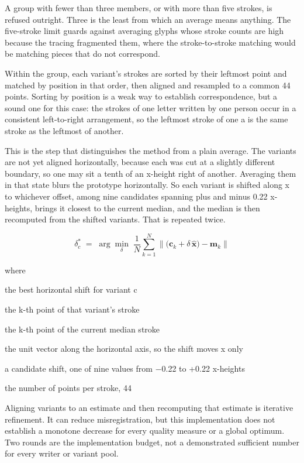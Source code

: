 A group with fewer than three members, or with more than five strokes, is refused outright. Three is the least from which an average means anything. The five-stroke limit guards against averaging glyphs whose stroke counts are high because the tracing fragmented them, where the stroke-to-stroke matching would be matching pieces that do not correspond.


Within the group, each variant's strokes are sorted by their leftmost point and matched by position in that order, then aligned and resampled to a common 44 points. Sorting by position is a weak way to establish correspondence, but a sound one for this case: the strokes of one letter written by one person occur in a consistent left-to-right arrangement, so the leftmost stroke of one a is the same stroke as the leftmost of another.


This is the step that distinguishes the method from a plain average. The variants are not yet aligned horizontally, because each was cut at a slightly different boundary, so one may sit a tenth of an x-height right of another. Averaging them in that state blurs the prototype horizontally. So each variant is shifted along x to whichever offset, among nine candidates spanning plus and minus 0.22 x-heights, brings it closest to the current median, and the median is then recomputed from the shifted variants. That is repeated twice.


\begin{equation}
\delta^{*}_c \;=\; \arg\min_{\delta} \; \frac{1}{N} \sum_{k=1}^{N} \Big\| \big(\mathbf{c}_k + \delta\,\hat{\mathbf{x}}\big) - \mathbf{m}_k \Big\|
\end{equation}

\noindent where
\begin{description}[leftmargin=2.4em,style=nextline,font=\normalfont\ttfamily]\setlength\itemsep{1pt}
  \item[{$\delta^{*}_c$}] \normalfont the best horizontal shift for variant c
  \item[{$\mathbf{c}_k$}] \normalfont the k-th point of that variant's stroke
  \item[{$\mathbf{m}_k$}] \normalfont the k-th point of the current median stroke
  \item[{$\hat{\mathbf{x}}$}] \normalfont the unit vector along the horizontal axis, so the shift moves x only
  \item[{$\delta$}] \normalfont a candidate shift, one of nine values from $-$0.22 to +0.22 x-heights
  \item[{$N$}] \normalfont the number of points per stroke, 44
\end{description}
Aligning variants to an estimate and then recomputing that estimate is iterative refinement. It can reduce misregistration, but this implementation does not establish a monotone decrease for every quality measure or a global optimum. Two rounds are the implementation budget, not a demonstrated sufficient number for every writer or variant pool.


